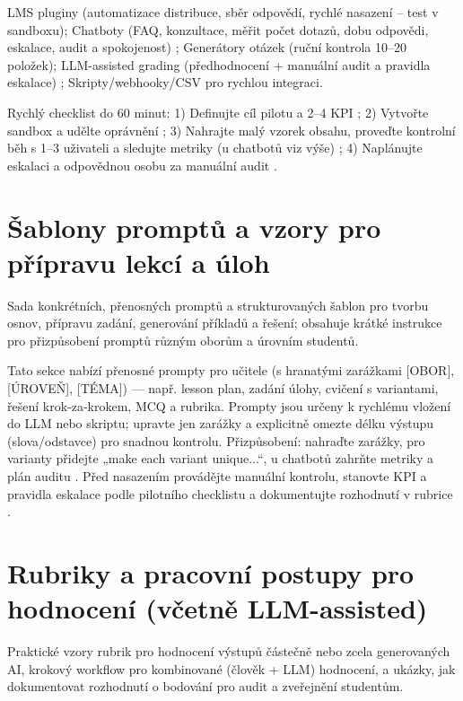 \documentclass{report}%
\begin{document}
LMS pluginy (automatizace distribuce, sběr odpovědí, rychlé nasazení – test v sandboxu); Chatboty (FAQ, konzultace, měřit počet dotazů, dobu odpovědi, eskalace, audit a spokojenost) \cite{2-5}; Generátory otázek (ruční kontrola 10–20 položek); LLM-assisted grading (předhodnocení + manuální audit a pravidla eskalace) \cite{2-6}; Skripty/webhooky/CSV pro rychlou integraci.

Rychlý checklist do 60 minut: 1) Definujte cíl pilotu a 2–4 KPI \cite{2-6}; 2) Vytvořte sandbox a udělte oprávnění \cite{2-6}; 3) Nahrajte malý vzorek obsahu, proveďte kontrolní běh s 1–3 uživateli a sledujte metriky (u chatbotů viz výše) \cite{2-5}; 4) Naplánujte eskalaci a odpovědnou osobu za manuální audit \cite{2-6}.%

%
\section{Šablony promptů a vzory pro přípravu lekcí a úloh}%
Sada konkrétních, přenosných promptů a strukturovaných šablon pro tvorbu osnov, přípravu zadání, generování příkladů a řešení; obsahuje krátké instrukce pro přizpůsobení promptů různým oborům a úrovním studentů.%


%
Tato sekce nabízí přenosné prompty pro učitele (s hranatými zarážkami [OBOR], [ÚROVEŇ], [TÉMA]) — např. lesson plan, zadání úlohy, cvičení s variantami, řešení krok‑za‑krokem, MCQ a rubrika.  
Prompty jsou určeny k rychlému vložení do LLM nebo skriptu; upravte jen zarážky a explicitně omezte délku výstupu (slova/odstavce) pro snadnou kontrolu.  
Přizpůsobení: nahraďte zarážky, pro varianty přidejte „make each variant unique...“, u chatbotů zahrňte metriky a plán auditu \cite{2-5}.  
Před nasazením provádějte manuální kontrolu, stanovte KPI a pravidla eskalace podle pilotního checklistu a dokumentujte rozhodnutí v rubrice \cite{2-6}.%

%
\section{Rubriky a pracovní postupy pro hodnocení (včetně LLM{-}assisted)}%
Praktické vzory rubrik pro hodnocení výstupů částečně nebo zcela generovaných AI, krokový workflow pro kombinované (člověk + LLM) hodnocení, a ukázky, jak dokumentovat rozhodnutí o bodování pro audit a zveřejnění studentům.%
\end{document}
